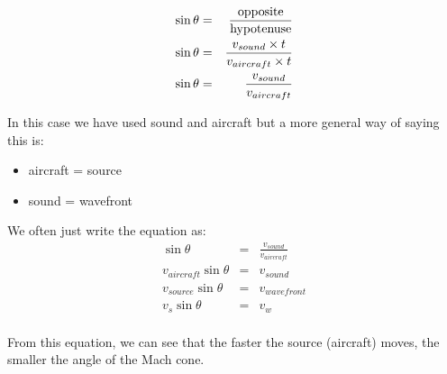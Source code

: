 \begin{eqnarray*}
\sin\theta&=&\frac{\rm{opposite}}{\rm{hypotenuse}} \\
\sin\theta&=&\frac{v_{sound}\times t}{v_{aircraft}\times t} \\
\sin\theta&=&\frac{v_{sound}}{v_{aircraft}} \\
\end{eqnarray*}

In this case we have used sound and aircraft but a more general way of saying this is:
\begin{itemize}
\item aircraft = source
\item sound = wavefront
\end{itemize}

We often just write the equation as:
\begin{eqnarray*}
\sin\theta&=&\frac{v_{sound}}{v_{aircraft}} \\
v_{aircraft}\sin\theta&=&v_{sound} \\
v_{source}\sin\theta&=&v_{wavefront} \\
v_{s}\sin\theta&=&v_{w} \\
\end{eqnarray*}

From this equation, we can see that the faster the source (aircraft) moves, the smaller the angle of the Mach cone.



